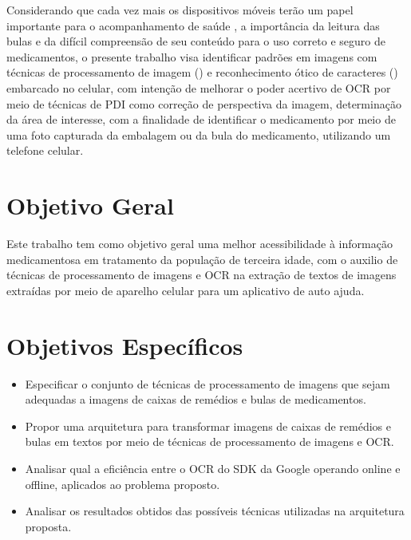 Considerando que cada vez mais os dispositivos móveis terão um papel importante para o acompanhamento de saúde \cite{ESTADAOCELULAR}, a importância da leitura das bulas e da difícil compreensão de seu conteúdo para o uso correto e seguro de medicamentos, o presente trabalho visa identificar padrões em imagens com técnicas de processamento de imagem () e reconhecimento ótico de caracteres () embarcado no celular, com intenção de melhorar o poder acertivo de OCR por meio de técnicas de PDI como correção de perspectiva da imagem, determinação da área de interesse, com a finalidade de identificar o medicamento por meio de uma foto capturada da embalagem ou da bula do medicamento, utilizando um telefone celular.




\section{Objetivo Geral}

Este trabalho tem como objetivo geral uma melhor acessibilidade à informação medicamentosa em tratamento da população de terceira idade, com o auxilio de técnicas de processamento de imagens e OCR na extração de textos de imagens extraídas por meio de aparelho celular para um aplicativo de auto ajuda.



\section{Objetivos Específicos}

\begin{itemize}
    Os objetivos específicos deste trabalho são:
    \item Especificar o conjunto de técnicas de processamento de imagens que sejam adequadas a imagens de caixas de remédios e bulas de medicamentos.
	\item Propor uma arquitetura para transformar imagens de caixas de remédios e bulas em textos por meio de técnicas de processamento de imagens e OCR.
	\item Analisar qual a eficiência entre o OCR do SDK da Google operando online e offline, aplicados ao problema proposto.
	\item Analisar os resultados obtidos das possíveis técnicas utilizadas na arquitetura proposta.

\end{itemize}


